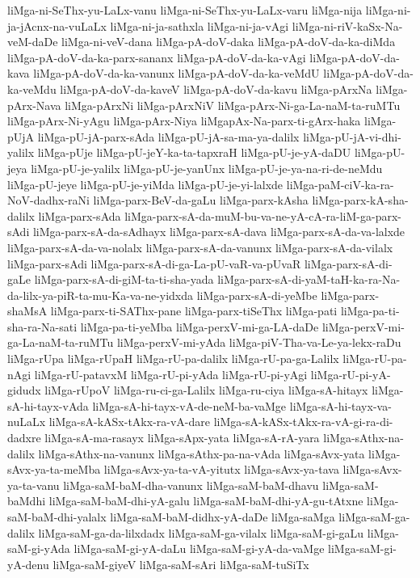 {liMga-ni-SeThx-yu-LaLx-vanu
liMga-ni-SeThx-yu-LaLx-varu
liMga-nija
liMga-ni-ja-jAcnx-na-vuLaLx
liMga-ni-ja-sathxla
liMga-ni-ja-vAgi
liMga-ni-riV-kaSx-Na-veM-daDe
liMga-ni-veV-dana
liMga-pA-doV-daka
liMga-pA-doV-da-ka-diMda
liMga-pA-doV-da-ka-parx-sananx
liMga-pA-doV-da-ka-vAgi
liMga-pA-doV-da-kava
liMga-pA-doV-da-ka-vanunx
liMga-pA-doV-da-ka-veMdU
liMga-pA-doV-da-ka-veMdu
liMga-pA-doV-da-kaveV
liMga-pA-doV-da-kavu
liMga-pArxNa
liMga-pArx-Nava
liMga-pArxNi
liMga-pArxNiV
liMga-pArx-Ni-ga-La-naM-ta-ruMTu
liMga-pArx-Ni-yAgu
liMga-pArx-Niya
liMgapAx-Na-parx-ti-gArx-haka
liMga-pUjA
liMga-pU-jA-parx-sAda
liMga-pU-jA-sa-ma-ya-dalilx
liMga-pU-jA-vi-dhi-yalilx
liMga-pUje
liMga-pU-jeY-ka-ta-tapxraH
liMga-pU-je-yA-daDU
liMga-pU-jeya
liMga-pU-je-yalilx
liMga-pU-je-yanUnx
liMga-pU-je-ya-na-ri-de-neMdu
liMga-pU-jeye
liMga-pU-je-yiMda
liMga-pU-je-yi-lalxde
liMga-paM-ciV-ka-ra-NoV-dadhx-raNi
liMga-parx-BeV-da-gaLu
liMga-parx-kAsha
liMga-parx-kA-sha-dalilx
liMga-parx-sAda
liMga-parx-sA-da-muM-bu-va-ne-yA-cA-ra-liM-ga-parx-sAdi
liMga-parx-sA-da-sAdhayx
liMga-parx-sA-dava
liMga-parx-sA-da-va-lalxde
liMga-parx-sA-da-va-nolalx
liMga-parx-sA-da-vanunx
liMga-parx-sA-da-vilalx
liMga-parx-sAdi
liMga-parx-sA-di-ga-La-pU-vaR-va-pUvaR
liMga-parx-sA-di-gaLe
liMga-parx-sA-di-giM-ta-ti-sha-yada
liMga-parx-sA-di-yaM-taH-ka-ra-Na-da-lilx-ya-piR-ta-mu-Ka-va-ne-yidxda
liMga-parx-sA-di-yeMbe
liMga-parx-shaMsA
liMga-parx-ti-SAThx-pane
liMga-parx-tiSeThx
liMga-pati
liMga-pa-ti-sha-ra-Na-sati
liMga-pa-ti-yeMba
liMga-perxV-mi-ga-LA-daDe
liMga-perxV-mi-ga-La-naM-ta-ruMTu
liMga-perxV-mi-yAda
liMga-piV-Tha-va-Le-ya-lekx-raDu
liMga-rUpa
liMga-rUpaH
liMga-rU-pa-dalilx
liMga-rU-pa-ga-Lalilx
liMga-rU-pa-nAgi
liMga-rU-patavxM
liMga-rU-pi-yAda
liMga-rU-pi-yAgi
liMga-rU-pi-yA-gidudx
liMga-rUpoV
liMga-ru-ci-ga-Lalilx
liMga-ru-ciya
liMga-sA-hitayx
liMga-sA-hi-tayx-vAda
liMga-sA-hi-tayx-vA-de-neM-ba-vaMge
liMga-sA-hi-tayx-va-nuLaLx
liMga-sA-kASx-tAkx-ra-vA-dare
liMga-sA-kASx-tAkx-ra-vA-gi-ra-di-dadxre
liMga-sA-ma-rasayx
liMga-sApx-yata
liMga-sA-rA-yara
liMga-sAthx-na-dalilx
liMga-sAthx-na-vanunx
liMga-sAthx-pa-na-vAda
liMga-sAvx-yata
liMga-sAvx-ya-ta-meMba
liMga-sAvx-ya-ta-vA-yitutx
liMga-sAvx-ya-tava
liMga-sAvx-ya-ta-vanu
liMga-saM-baM-dha-vanunx
liMga-saM-baM-dhavu
liMga-saM-baMdhi
liMga-saM-baM-dhi-yA-galu
liMga-saM-baM-dhi-yA-gu-tAtxne
liMga-saM-baM-dhi-yalalx
liMga-saM-baM-didhx-yA-daDe
liMga-saMga
liMga-saM-ga-dalilx
liMga-saM-ga-da-lilxdadx
liMga-saM-ga-vilalx
liMga-saM-gi-gaLu
liMga-saM-gi-yAda
liMga-saM-gi-yA-daLu
liMga-saM-gi-yA-da-vaMge
liMga-saM-gi-yA-denu
liMga-saM-giyeV
liMga-saM-sAri
liMga-saM-tuSiTx
}
